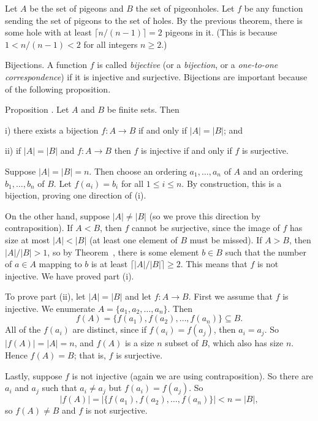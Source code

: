 \proof Let $A$ be the set of pigeons and $B$ the set of pigeonholes. Let $f$ be any function sending
the set of pigeons to the set of holes. By the previous theorem, there is some hole with at least
$\lceil n/(n-1)\rceil = 2$ pigeons in it. (This is because $1 < n/(n-1) < 2$ for all integers $n\ge 2$.)\slug

\medskip\boldlabel Bijections.
A function $f$ is called {\it bijective} (or a {\it bijection}, or a {\it one-to-one correspondence})
if it is injective and surjective. Bijections are important because of the following proposition.

\proclaim Proposition \advthm. Let $A$ and $B$ be finite sets. Then
\medskip
\item{i)} there exists a bijection $f:A\to B$ if and only if $|A| = |B|$; and
\smallskip
\item{ii)} if $|A| = |B|$ and $f:A\to B$ then $f$ is injective if and only if $f$ is surjective.
\medskip

\proof Suppose $|A| = |B| = n$. Then choose an ordering $a_1, \ldots, a_n$ of $A$ and an ordering
$b_1, \ldots, b_n$ of $B$. Let $f(a_i) = b_i$ for all $1\le i\le n$. By construction, this is a bijection,
proving one direction of (i).

On the other hand, suppose $|A|\ne |B|$ (so we prove this direction by contraposition).
If $A<B$, then $f$ cannot be surjective, since the image of
$f$ has size at most $|A| < |B|$ (at least one element of $B$ must be missed). If $A>B$, then
$|A|/|B| > 1$, so by Theorem~{\thmgeneralpigeonhole}, there is some element $b\in B$
such that the number of $a\in A$ mapping to $b$ is at least $\lceil |A|/|B| \rceil \ge 2$.
This means that $f$ is not injective. We have proved part (i).

To prove part (ii), let $|A| = |B|$ and let $f:A\to B$. First we assume that $f$ is injective.
We enumerate $A = \{a_1, a_2, \ldots, a_n\}$. Then
$$f(A) = \bigl\{ f(a_1), f(a_2), \ldots, f(a_n)\bigr\} \subseteq B.$$
All of the $f(a_i)$ are distinct, since if $f(a_i) = f(a_j)$, then $a_i = a_j$. So
$\bigl| f(A)\bigr| = |A| = n$, and $f(A)$ is a size $n$ subset of $B$, which also has size $n$.
Hence $f(A) = B$; that is, $f$ is surjective.

Lastly, suppose $f$ is not injective (again we are using contraposition). So there
are $a_i$ and $a_j$ such that $a_i\ne a_j$ but $f(a_i) = f(a_j)$. So
$$\bigl|f(A)\bigr| = \bigl|\bigl\{ f(a_1), f(a_2), \ldots, f(a_n)\bigr\}\bigr| < n = |B|,$$
so $f(A) \ne B$ and $f$ is not surjective.\slug

